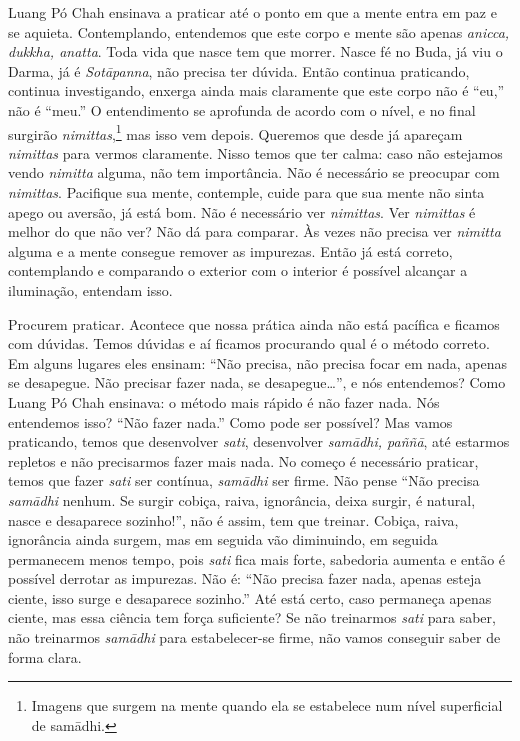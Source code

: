 Luang Pó Chah ensinava a praticar até o ponto em que a mente entra
em paz e se aquieta. Contemplando, entendemos que este corpo e mente
são apenas \textit{anicca, dukkha, anatta}. Toda vida que nasce tem que
morrer. Nasce fé no Buda, já viu o Darma, já é \textit{Sotāpanna},
não precisa ter dúvida. Então continua praticando, continua
investigando, enxerga ainda mais claramente que este corpo não é “eu,”
não é “meu.” O entendimento se aprofunda de acordo com o nível, e no
final surgirão \textit{nimittas},\footnote{Imagens que surgem na mente
quando ela se estabelece num nível superficial de samādhi.} mas isso
vem depois. Queremos que desde já apareçam \textit{nimittas} para
vermos claramente. Nisso temos que ter calma: caso não estejamos vendo
\textit{nimitta} alguma, não tem importância. Não é necessário se
preocupar com \textit{nimittas}. Pacifique sua mente, contemple, cuide
para que sua mente não sinta apego ou aversão, já está bom. Não é
necessário ver \textit{nimittas}. Ver \textit{nimittas} é melhor do que
não ver? Não dá para comparar. Às vezes não precisa ver
\textit{nimitta} alguma e a mente consegue remover as impurezas. Então
já está correto, contemplando e comparando o exterior com o interior é
possível alcançar a iluminação, entendam isso. 

Procurem praticar. Acontece que nossa prática ainda não está
pacífica e ficamos com dúvidas. Temos dúvidas e aí ficamos procurando
qual é o método correto. Em alguns lugares eles ensinam: “Não precisa,
não precisa focar em nada, apenas se desapegue. Não precisar fazer
nada, se desapegue…”, e nós entendemos? Como Luang Pó Chah ensinava: o
método mais rápido é não fazer nada. Nós entendemos isso? “Não fazer
nada.” Como pode ser possível? Mas vamos praticando, temos que
desenvolver \textit{sati}, desenvolver \textit{samādhi, paññā}, até
estarmos repletos e não precisarmos fazer mais nada. No começo é
necessário praticar, temos que fazer \textit{sati} ser contínua,
\textit{samādhi} ser firme. Não pense “Não precisa \textit{samādhi}
nenhum. Se surgir cobiça, raiva, ignorância, deixa surgir, é natural,
nasce e desaparece sozinho!”, não é assim, tem que treinar. Cobiça,
raiva, ignorância ainda surgem, mas em seguida vão diminuindo, em
seguida permanecem menos tempo, pois \textit{sati} fica mais forte,
sabedoria aumenta e então é possível derrotar as impurezas. Não é: “Não
precisa fazer nada, apenas esteja ciente, isso surge e desaparece
sozinho.” Até está certo, caso permaneça apenas ciente, mas essa
ciência tem força suficiente? Se não treinarmos \textit{sati} para
saber, não treinarmos \textit{samādhi} para estabelecer-se firme, não
vamos conseguir saber de forma clara. 

